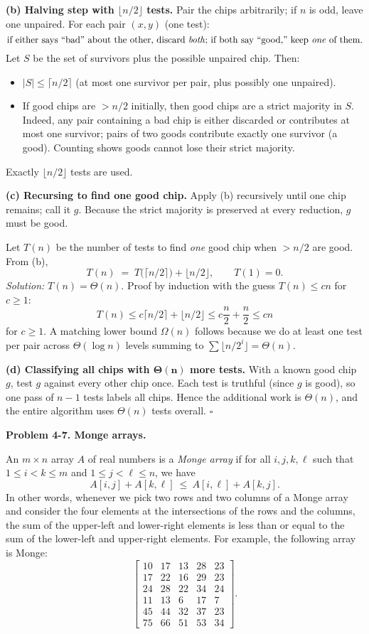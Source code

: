 \documentclass[12pt]{article}
\theoremstyle{definition}
\begin{document}
\medskip
\noindent\textbf{(b) Halving step with $\lfloor n/2\rfloor$ tests.}
Pair the chips arbitrarily; if $n$ is odd, leave one unpaired. For each pair $(x,y)$ (one test):
\[
\text{if either says “bad” about the other, discard \emph{both}; if both say “good,” keep \emph{one} of them.}
\]
Let $S$ be the set of survivors plus the possible unpaired chip. Then:
\begin{itemize}
\item $|S|\le \lceil n/2\rceil$ (at most one survivor per pair, plus possibly one unpaired).
\item If good chips are $>n/2$ initially, then good chips are a strict majority in $S$.  
Indeed, any pair containing a bad chip is either discarded or contributes at most one survivor; pairs of two goods contribute exactly one survivor (a good). Counting shows goods cannot lose their strict majority.
\end{itemize}
Exactly $\lfloor n/2\rfloor$ tests are used.

\medskip
\noindent\textbf{(c) Recursing to find one good chip.}
Apply (b) recursively until one chip remains; call it $g$. Because the strict majority is preserved at every reduction, $g$ must be good.

Let $T(n)$ be the number of tests to find \emph{one} good chip when $>n/2$ are good. From (b),
\[
T(n)\;=\;T\!\big(\lceil n/2\rceil\big)+\big\lfloor n/2\big\rfloor,\qquad T(1)=0.
\]
\emph{Solution:} $T(n)=\Theta(n)$.  
Proof by induction with the guess $T(n)\le c n$ for $c\ge1$:
\[
T(n)\le c\lceil n/2\rceil+\lfloor n/2\rfloor \le c\frac{n}{2}+\frac{n}{2}\le cn
\]
for $c\ge1$. A matching lower bound $\Omega(n)$ follows because we do at least one test per pair across $\Theta(\log n)$ levels summing to $\sum \lfloor n/2^i\rfloor=\Theta(n)$.

\medskip
\noindent\textbf{(d) Classifying all chips with $\boldsymbol{\Theta(n)}$ more tests.}
With a known good chip $g$, test $g$ against every other chip once. Each test is truthful (since $g$ is good), so one pass of $n-1$ tests labels all chips. Hence the additional work is $\Theta(n)$, and the entire algorithm uses $\Theta(n)$ tests overall.
\hfill$\square$

\newpage

\noindent\textbf{Problem 4-7. Monge arrays.}

\medskip
An $m\times n$ array $A$ of real numbers is a \emph{Monge array} if for all $i,j,k,\ell$ such that
$1\le i<k\le m$ and $1\le j<\ell\le n$, we have
\[
A[i,j]+A[k,\ell]\ \le\ A[i,\ell]+A[k,j].
\]
In other words, whenever we pick two rows and two columns of a Monge array and consider the four
elements at the intersections of the rows and the columns, the sum of the upper-left and lower-right
elements is less than or equal to the sum of the lower-left and upper-right elements. For example,
the following array is Monge:
\[
\begin{bmatrix}
10&17&13&28&23\\
17&22&16&29&23\\
24&28&22&34&24\\
11&13&6&17&7\\
45&44&32&37&23\\
75&66&51&53&34
\end{bmatrix}.
\]
\end{document}
